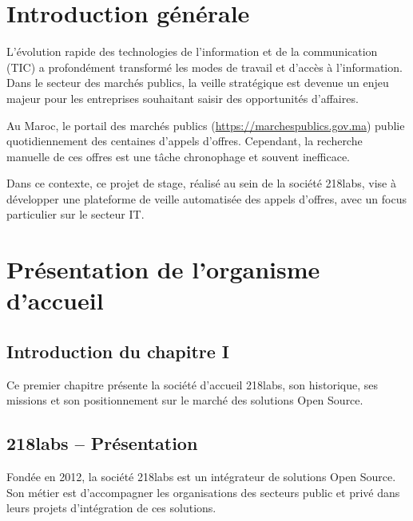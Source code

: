 \documentclass[12pt,a4paper]{report}
\begin{document}
\listoffigures

\listoftables

\tableofcontents

\chapter*{Introduction générale}

L'évolution rapide des technologies de l'information et de la communication (TIC) a profondément transformé les modes de travail et d'accès à l'information. Dans le secteur des marchés publics, la veille stratégique est devenue un enjeu majeur pour les entreprises souhaitant saisir des opportunités d'affaires.

Au Maroc, le portail des marchés publics (\url{https://marchespublics.gov.ma}) publie quotidiennement des centaines d'appels d'offres. Cependant, la recherche manuelle de ces offres est une tâche chronophage et souvent inefficace.

Dans ce contexte, ce projet de stage, réalisé au sein de la société 218labs, vise à développer une plateforme de veille automatisée des appels d'offres, avec un focus particulier sur le secteur IT.

\chapter{Présentation de l'organisme d'accueil}

\section*{Introduction du chapitre I}

Ce premier chapitre présente la société d'accueil 218labs, son historique, ses missions et son positionnement sur le marché des solutions Open Source.

\section{218labs -- Présentation}

Fondée en 2012, la société 218labs est un intégrateur de solutions Open Source. Son métier est d'accompagner les organisations des secteurs public et privé dans leurs projets d'intégration de ces solutions.
\end{document}
